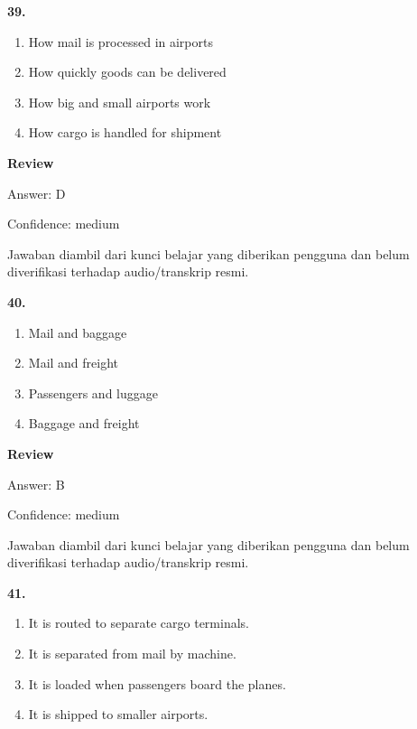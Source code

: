 \documentclass[12pt]{article}
\begin{document}
\noindent\textbf{39.}
\begin{enumerate}[label=(\Alph*),leftmargin=*,itemsep=0.2em]
\item How mail is processed in airports
\item How quickly goods can be delivered
\item How big and small airports work
\item How cargo is handled for shipment
\end{enumerate}
\par
\begingroup
\setlength{\parskip}{0pt}
\setlength{\parindent}{0pt}
\textbf{Review}\par
Answer: D\par
Confidence: medium\par
Jawaban diambil dari kunci belajar yang diberikan pengguna dan belum diverifikasi terhadap audio/transkrip resmi.\par
\endgroup
\par
\vspace{0.25\baselineskip}
\noindent\textbf{40.}
\begin{enumerate}[label=(\Alph*),leftmargin=*,itemsep=0.2em]
\item Mail and baggage
\item Mail and freight
\item Passengers and luggage
\item Baggage and freight
\end{enumerate}
\par
\begingroup
\setlength{\parskip}{0pt}
\setlength{\parindent}{0pt}
\textbf{Review}\par
Answer: B\par
Confidence: medium\par
Jawaban diambil dari kunci belajar yang diberikan pengguna dan belum diverifikasi terhadap audio/transkrip resmi.\par
\endgroup
\par
\vspace{0.25\baselineskip}
\noindent\textbf{41.}
\begin{enumerate}[label=(\Alph*),leftmargin=*,itemsep=0.2em]
\item It is routed to separate cargo terminals.
\item It is separated from mail by machine.
\item It is loaded when passengers board the planes.
\item It is shipped to smaller airports.
\end{enumerate}
\par
\end{document}
